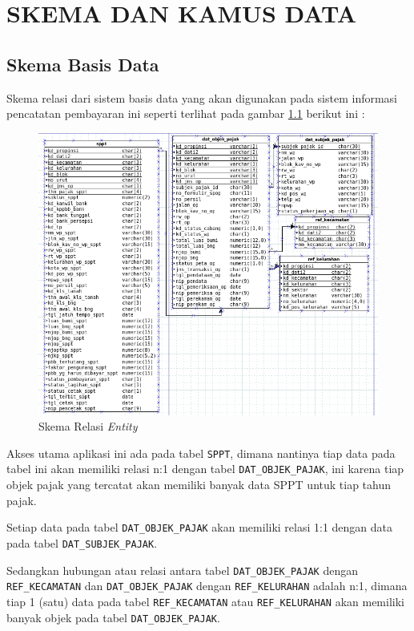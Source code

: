 \chapter{SKEMA DAN KAMUS DATA}

\section{Skema Basis Data}

Skema relasi dari sistem basis data yang akan digunakan pada sistem informasi pencatatan pembayaran ini seperti terlihat pada gambar \ref{fig:dia-relasi-entity} berikut ini :

\begin{figure}[H]
	\centering
	\includegraphics[width=1\textwidth]{./resources/db-diagram}
	\caption{Skema Relasi \textit{Entity}}
	\label{fig:dia-relasi-entity}
\end{figure}

Akses utama aplikasi ini ada pada tabel \texttt{SPPT}, dimana nantinya tiap data pada tabel ini akan memiliki relasi n:1 dengan tabel \texttt{DAT\_OBJEK\_PAJAK}, ini karena tiap objek pajak yang tercatat akan memiliki banyak data SPPT untuk tiap tahun pajak.

Setiap data pada tabel \texttt{DAT\_OBJEK\_PAJAK} akan memiliki relasi 1:1 dengan data pada tabel \texttt{DAT\_SUBJEK\_PAJAK}.

Sedangkan hubungan atau relasi antara tabel \texttt{DAT\_OBJEK\_PAJAK} dengan \texttt{REF\_KECAMATAN} dan \texttt{DAT\_OBJEK\_PAJAK} dengan \texttt{REF\_KELURAHAN} adalah n:1, dimana tiap 1 (satu) data pada tabel \texttt{REF\_KECAMATAN} atau \texttt{REF\_KELURAHAN} akan memiliki banyak objek pada tabel \texttt{DAT\_OBJEK\_PAJAK}.

